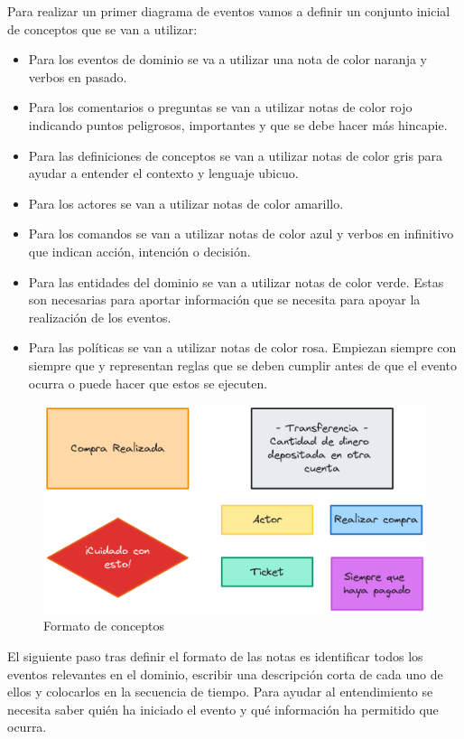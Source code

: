 Para realizar un primer diagrama de eventos vamos a definir un conjunto inicial de conceptos que se van a utilizar:

\begin{itemize}
    \item Para los eventos de dominio se va a utilizar una nota de color naranja y verbos en pasado.
    \item Para los comentarios o preguntas se van a utilizar notas de color rojo indicando puntos peligrosos, importantes y que se debe hacer más hincapie.
    \item Para las definiciones de conceptos se van a utilizar notas de color gris para ayudar a entender el contexto y lenguaje ubicuo.
    \item Para los actores se van a utilizar notas de color amarillo.
    \item Para los comandos se van a utilizar notas de color azul y verbos en infinitivo que indican acción, intención o decisión.
    \item Para las entidades del dominio se van a utilizar notas de color verde. Estas son necesarias para aportar información que se necesita para apoyar la realización de los eventos.
    \item Para las políticas se van a utilizar notas de color rosa. Empiezan siempre con siempre que y representan reglas que se deben cumplir antes de que el evento ocurra o puede hacer que estos se ejecuten.
\end{itemize}

\begin{figure}[ht]
    \caption{Formato de conceptos}
    \centering
    \vspace*{0.5cm}
    \includegraphics[scale=0.25]{figuras/conceptos.png}
\end{figure}

El siguiente paso tras definir el formato de las notas es identificar todos los eventos relevantes en el dominio, escribir una descripción corta de cada uno de ellos y colocarlos en la secuencia de tiempo. Para ayudar al entendimiento se necesita saber quién ha iniciado el evento y qué información ha permitido que ocurra.

